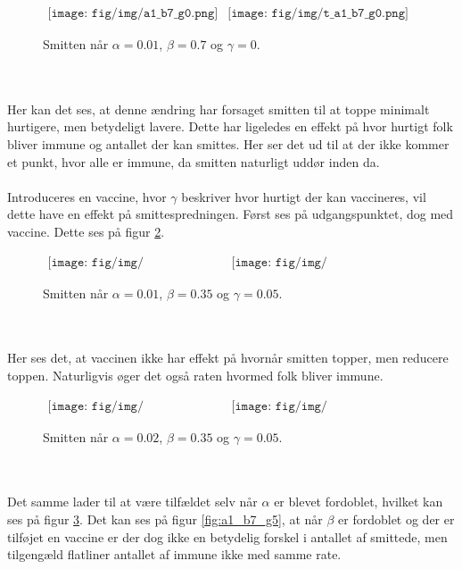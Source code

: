 %
\begin{figure}[!ht]
\centering
$
\begin{matrix}
\texttt{[image: fig/img/a1\_b7\_g0.png]}&
\texttt{[image: fig/img/t\_a1\_b7\_g0.png]}
\end{matrix}
$
\caption{Smitten når $\alpha = 0.01$, $\beta = 0.7$ og $\gamma = 0$.}
\label{fig:a1_b7_g0}
\end{figure}\\\\
%
Her kan det ses, at denne ændring har forsaget smitten til at toppe minimalt hurtigere, men betydeligt lavere.
Dette har ligeledes en effekt på hvor hurtigt folk bliver immune og antallet der kan smittes.
Her ser det ud til at der ikke kommer et punkt, hvor alle er immune, da smitten naturligt uddør inden da.\\\\
%
Introduceres en vaccine, hvor $\gamma$ beskriver hvor hurtigt der kan vaccineres, vil dette have en effekt på smittespredningen.
Først ses på udgangspunktet, dog med vaccine.
Dette ses på figur \ref{fig:a1_b35_g5}.
%
\begin{figure}[!ht]
\centering
$
\begin{matrix}
\texttt{[image: fig/img/a1\_b35\_g5.png]}&
\texttt{[image: fig/img/t\_a1\_b35\_g5.png]}
\end{matrix}
$
\caption{Smitten når $\alpha = 0.01$, $\beta = 0.35$ og $\gamma = 0.05$.}
\label{fig:a1_b35_g5}
\end{figure}\\\\
%
Her ses det, at vaccinen ikke har effekt på hvornår smitten topper, men reducere toppen.
Naturligvis øger det også raten hvormed folk bliver immune.
%
\begin{figure}[!ht]
\centering
$
\begin{matrix}
\texttt{[image: fig/img/a2\_b35\_g5.png]}&
\texttt{[image: fig/img/t\_a2\_b35\_g5.png]}
\end{matrix}
$
\caption{Smitten når $\alpha = 0.02$, $\beta = 0.35$ og $\gamma = 0.05$.}
\label{fig:a2_b35_g5}
\end{figure}\\\\
%
Det samme lader til at være tilfældet selv når $\alpha$ er blevet fordoblet, hvilket kan ses på figur \ref{fig:a2_b35_g5}.
Det kan ses på figur \ref{fig:a1_b7_g5}, at når $\beta$ er fordoblet og der er tilføjet en vaccine er der dog ikke en betydelig forskel i antallet af smittede, men tilgengæld flatliner antallet af immune ikke med samme rate.

